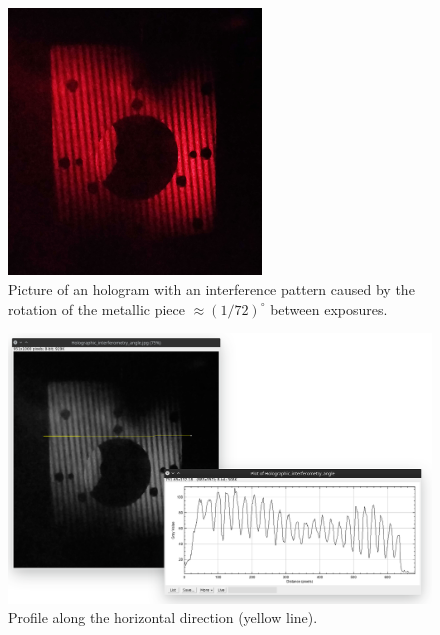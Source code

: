 \documentclass[11pt,a4paper]{article}
\begin{document}
\begin{figure}[ht]
\centering
\includegraphics[width=0.6\textwidth]{Holographic_interferometry_angle}
\caption{Picture of an hologram with an interference pattern caused by the rotation of the metallic piece $\approx (1/72)^\circ$ between exposures.}
\label{fig:holographic_interferometry_angle}
\end{figure}

\begin{figure}[ht]
\centering
\includegraphics[width=\textwidth]{Holographic_interferometry_angle_fringes}
\caption{Profile along the horizontal direction (yellow line).}
\label{fig:holographic_interferometry_angle_fringes}
\end{figure}
\end{document}
